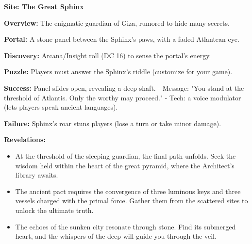 \documentclass[12pt]{article}
\begin{document}
\textbf{Site: The Great Sphinx}

\textbf{Overview:}  
The enigmatic guardian of Giza, rumored to hide many secrets.

\textbf{Portal:}  
A stone panel between the Sphinx's paws, with a faded Atlantean eye.

\textbf{Discovery:}  
Arcana/Insight roll (DC 16) to sense the portal's energy.

\textbf{Puzzle:}  
Players must answer the Sphinx's riddle (customize for your game).

\textbf{Success:}  
Panel slides open, revealing a deep shaft.  
- Message: "You stand at the threshold of Atlantis. Only the worthy may proceed."  
- Tech: a voice modulator (lets players speak ancient languages).

\textbf{Failure:}  
Sphinx's roar stuns players (lose a turn or take minor damage).

\textbf{Revelations:}
\begin{itemize}
  \item At the threshold of the sleeping guardian, the final path unfolds. Seek the wisdom held within the heart of the great pyramid, where the Architect's library awaits.
  \item The ancient pact requires the convergence of three luminous keys and three vessels charged with the primal force. Gather them from the scattered sites to unlock the ultimate truth.
  \item The echoes of the sunken city resonate through stone. Find its submerged heart, and the whispers of the deep will guide you through the veil.
\end{itemize}
\end{document}
